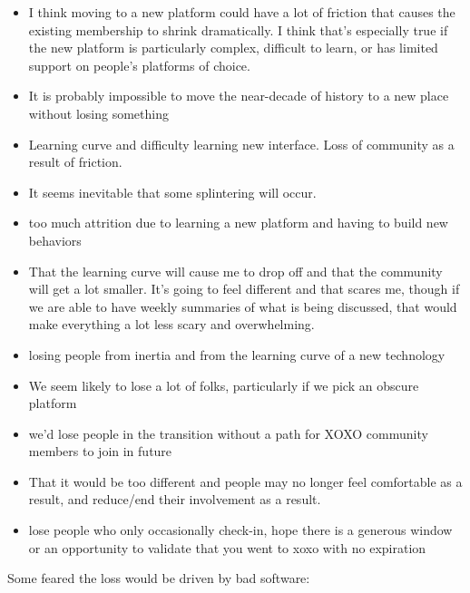 \documentclass[
]{book}
\providecommand{\tightlist}{%
  \setlength{\itemsep}{0pt}\setlength{\parskip}{0pt}}
\begin{document}
\begin{itemize}
\tightlist
\item
  I think moving to a new platform could have a lot of friction that causes the existing membership to shrink dramatically. I think that's especially true if the new platform is particularly complex, difficult to learn, or has limited support on people's platforms of choice.
\item
  It is probably impossible to move the near-decade of history to a new place without losing something
\item
  Learning curve and difficulty learning new interface. Loss of community as a result of friction.
\item
  It seems inevitable that some splintering will occur.
\item
  too much attrition due to learning a new platform and having to build new behaviors
\item
  That the learning curve will cause me to drop off and that the community will get a lot smaller. It's going to feel different and that scares me, though if we are able to have weekly summaries of what is being discussed, that would make everything a lot less scary and overwhelming.
\item
  losing people from inertia and from the learning curve of a new technology
\item
  We seem likely to lose a lot of folks, particularly if we pick an obscure platform
\item
  we'd lose people in the transition without a path for XOXO community members to join in future
\item
  That it would be too different and people may no longer feel comfortable as a result, and reduce/end their involvement as a result.
\item
  lose people who only occasionally check-in, hope there is a generous window or an opportunity to validate that you went to xoxo with no expiration
\end{itemize}

Some feared the loss would be driven by bad software:
\end{document}
